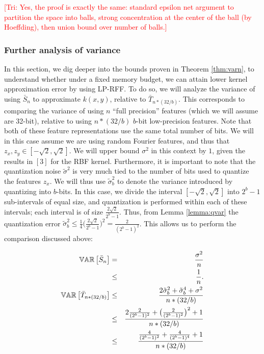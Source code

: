 \documentclass[12pt]{article}
\newcommand\tri[1]{\textcolor{red}{[Tri: #1]}}
\newcommand{\bS}{\bar{S}}
\newcommand{\bT}{\bar{T}}
\newcommand{\sq}{\sqrt{2}}
\newcommand{\tsigma}{\tilde{\sigma}}
\begin{document}
\tri{Yes, the proof is exactly the same: standard epsilon net argument to
partition the space into balls, strong concentration at the center of the ball
(by Hoeffding), then union bound over number of balls.}

\subsubsection{Further analysis of variance}
In this section, we dig deeper into the bounds proven in Theorem \ref{thm:varn}, to understand whether under a fixed memory budget, we can attain lower kernel approximation error by using LP-RFF.
To do so, we will analyze the variance of using $\bS_n$ to approximate $k(x,y)$, relative to $\bT_{n*(32/b)}$.  This corresponds to comparing the variance of using $n$ ``full precision''  features (which we will assume are 32-bit), relative to using $n*(32/b)$ $b$-bit low-precision features. Note that both of these feature representations use the same total number of bits.  We will in this case assume we are using random Fourier features, and thus that
$z_x,z_y \in [-\sq,\sq]$.  We will upper bound $\sigma^2$ in this context by $1$, given the results in $[3]$ for the RBF kernel.  Furthermore, it is important to note that the quantization noise $\tsigma^2$ is very much tied to the number of bits used to quantize the features $z_x$.  We will thus use $\tsigma_b^2$ to denote the variance introduced by quantizing into $b$-bits.  In this case, we divide the interval $[-\sq,\sq]$ into $2^b-1$ sub-intervals of equal size, and quantization is performed within each of these intervals; each interval is of size $\frac{2\sq}{2^b-1}$. 
Thus, from Lemma \ref{lemma:qvar} the quantization error $\tsigma_b^2 \leq \frac{1}{4}\Big(\frac{2\sq}{2^b-1}\Big)^2 = \frac{2}{(2^b-1)^2}$.  This allows us to perform the comparison discussed above:

\begin{eqnarray*}
	\var{}{\bS_n} &=& \frac{\sigma^2}{n} \\
	&\leq& \frac{1}{n}. \\
	\var{}{\bT_{n*(32/b)}} &\leq& \frac{2\tsigma_b^2 + \tsigma_b^4 +  \sigma^2}{n*(32/b)} \\
	&\leq& \frac{2\frac{2}{(2^b-1)^2}  + \big(\frac{2}{(2^b-1)^2}\big)^2+ 1}{n*(32/b)}\\
	&\leq& \frac{\frac{4}{(2^b-1)^2} + \frac{4}{(2^b-1)^4} +  1}{n*(32/b)}\\
\end{eqnarray*}
\end{document}
